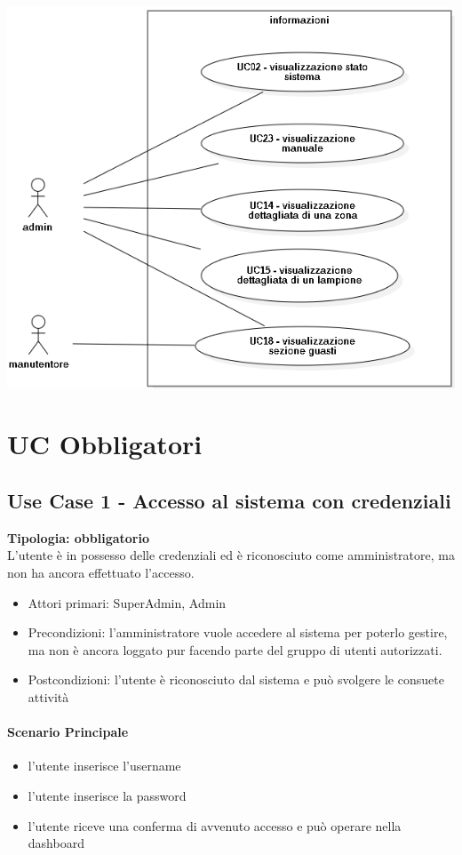 \documentclass[12pt]{article}
\begin{document}
\includegraphics[scale=0.5]{informazioni.png}	

\pagebreak
\section{UC Obbligatori}

\subsection{Use Case 1 - Accesso al sistema con credenziali}
\textbf{Tipologia: obbligatorio} \\
L'utente è in possesso delle credenziali ed è riconosciuto come amministratore, ma non ha ancora effettuato l'accesso.
\begin{itemize}
	\item Attori primari: SuperAdmin, Admin
	\item Precondizioni: l'amministratore vuole accedere al sistema per poterlo gestire, ma non è ancora loggato pur facendo parte del gruppo di utenti autorizzati.
	\item Postcondizioni: l'utente è riconosciuto dal sistema e può svolgere le consuete attività
\end{itemize}
\paragraph{Scenario Principale}
\begin{itemize}
	\item l'utente inserisce l'username
	\item l'utente inserisce la password
	\item l'utente riceve una conferma di avvenuto accesso e può operare nella dashboard
\end{itemize}
\end{document}
